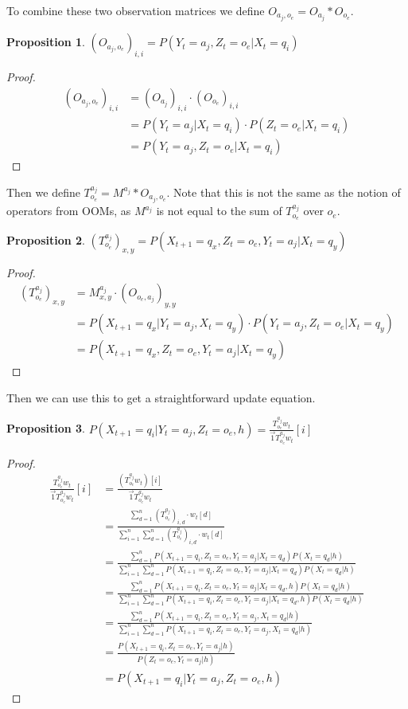 \documentclass{article}
\newtheorem{prop}{Proposition}
\theoremstyle{definition}
\begin{document}
To combine these two observation matrices we define $O_{a_j,o_e}=O_{a_j}*O_{o_e}$. 
\begin{prop} 
$(O_{a_j,o_e})_{i,i}=P(Y_t=a_j,Z_t=o_e|X_t=q_i)$
\end{prop}
\begin{proof}
\begin{align*}
(O_{a_j,o_e})_{i,i}&=(O_{a_j})_{i,i}\cdot (O_{o_e})_{i,i} \\
&=P(Y_t=a_j|X_t=q_i)\cdot P(Z_t=o_e|X_t=q_i) \\
&=P(Y_t=a_j,Z_t=o_e|X_t=q_i)
\end{align*}
\end{proof}
Then we define $T^{a_j}_{o_e}=M^{a_j}*O_{a_j,o_e}$. Note that this is not the same as the notion of operators from OOMs, as $M^{a_j}$ is not equal to the sum of $T^{a_j}_{o_e}$ over $o_e$.
\begin{prop}
$(T^{a_j}_{o_e})_{x,y}=P(X_{t+1}=q_x,Z_t=o_e,Y_{t}=a_j|X_t=q_y)$
\end{prop}
\begin{proof}
\begin{align*}
(T^{a_j}_{o_e})_{x,y}&=M^{a_j}_{x,y}\cdot (O_{o_e,a_j})_{y,y} \\
&=P(X_{t+1}=q_x|Y_t=a_j,X_{t}=q_y)\cdot P(Y_t=a_j,Z_t=o_e|X_{t}=q_y) \\
&=P(X_{t+1}=q_x,Z_t=o_e,Y_{t}=a_j|X_t=q_y)
\end{align*}
\end{proof}
Then we can use this to get a straightforward update equation. 
\begin{prop}
$P(X_{t+1}=q_i|Y_t=a_j,Z_t=o_e,h)=\frac{T^{a_j}_{o_e}w_t}{\vec{1} T^{a_j}_{o_e}w_t}[i]$
\end{prop}
\begin{proof}
\begin{align*}
\frac{T^{a_j}_{o_e}w_t}{\vec{1} T^{a_j}_{o_e}w_t}[i]&=\frac{(T^{a_j}_{o_e}w_t)[i]}{\vec{1} T^{a_j}_{o_e}w_t} \\
&=\frac{\sum\limits_{d=1}^{n} (T^{a_j}_{o_e})_{i,d}\cdot w_t[d]}{\sum\limits_{i=1}^{n} \sum\limits_{d=1}^{n} (T^{a_j}_{o_e})_{i,d}\cdot w_t[d]} \\
&=\frac{\sum\limits_{d=1}^{n} P(X_{t+1}=q_i,Z_t=o_e,Y_{t}=a_j|X_t=q_d) P(X_t=q_d|h)}{\sum\limits_{i=1}^{n}\sum\limits_{d=1}^{n} P(X_{t+1}=q_i,Z_t=o_e,Y_{t}=a_j|X_t=q_d) P(X_t=q_d|h)} \\
&=\frac{\sum\limits_{d=1}^{n} P(X_{t+1}=q_i,Z_t=o_e,Y_{t}=a_j|X_t=q_d,h) P(X_t=q_d|h)}{\sum\limits_{i=1}^{n}\sum\limits_{d=1}^{n} P(X_{t+1}=q_i,Z_t=o_e,Y_{t}=a_j|X_t=q_d,h) P(X_t=q_d|h)} \\
&=\frac{\sum\limits_{d=1}^{n} P(X_{t+1}=q_i,Z_t=o_e,Y_t=a_j,X_t=q_d|h)}{\sum\limits_{i=1}^n \sum\limits_{d=1}^{n} P(X_{t+1}=q_i,Z_t=o_e,Y_t=a_j,X_t=q_d|h) } \\
&=\frac{P(X_{t+1}=q_i,Z_t=o_e,Y_t=a_j|h)}{P(Z_t=o_e,Y_t=a_j|h)} \\
&=P(X_{t+1}=q_i|Y_t=a_j,Z_t=o_e,h)
\end{align*}
\end{proof}
\end{document}
